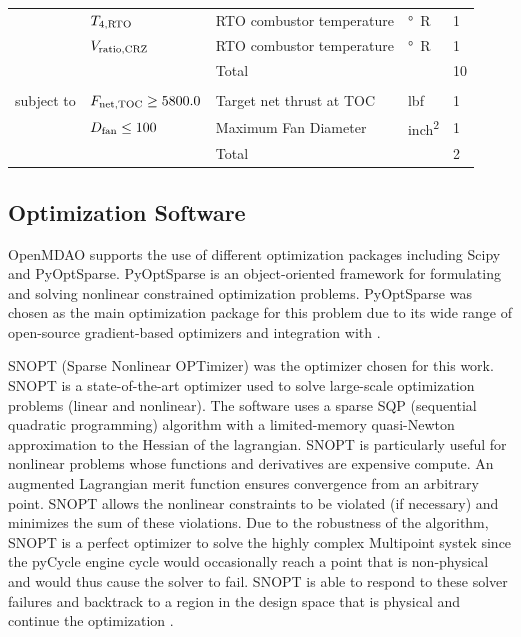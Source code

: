 \documentclass[conf]{new-aiaa}
\begin{document}
\begin{table}[hbt!]
\begin{tabular}{r l l l l}
                        & $T_{4,\rm{RTO}}$               & RTO combustor temperature                   & \unit{\degree R} & 1        \\
                        & $V_{\rm{ratio,CRZ}}$           & RTO combustor temperature                   & \unit{\degree R} & 1        \\
        \cline{3-5}
                        &                                & Total                                       &                  & 10       \\
                        &                                &                                             &                  &          \\
        subject to      & $F_{\rm{net,TOC}} \geq 5800.0$ & Target net thrust at TOC                    & \unit{lbf}       & 1        \\
                        & $D_{\rm{fan}} \leq 100$        & Maximum Fan Diameter                        & \unit{inch^2}    & 1        \\
        \cline{3-5}
                        &                                & Total                                       &                  & 2        \\
        \bottomrule
    \end{tabular}
    \label{tab:opt_problem}
\end{table}

\subsection{Optimization Software}
OpenMDAO supports the use of different optimization packages including Scipy and PyOptSparse.
PyOptSparse is an object-oriented framework for formulating and solving nonlinear constrained optimization problems.
PyOptSparse was chosen as the main optimization package for this problem due to its wide range of open-source gradient-based optimizers and integration with  \cite{Wu2020a}.

SNOPT (Sparse Nonlinear OPTimizer) was the optimizer chosen for this work.
SNOPT is a state-of-the-art optimizer used to solve large-scale optimization problems (linear and nonlinear).
The software uses a sparse SQP (sequential quadratic programming) algorithm with a limited-memory quasi-Newton approximation to the Hessian of the lagrangian.
SNOPT is particularly useful for nonlinear problems whose functions and derivatives are expensive compute.
An augmented Lagrangian merit function ensures convergence from an arbitrary point.
SNOPT allows the nonlinear constraints to be violated (if necessary) and minimizes the sum of these violations.
Due to the robustness of the algorithm, SNOPT is a perfect optimizer to solve the highly complex Multipoint systek since the pyCycle engine cycle would occasionally reach a point that is non-physical and would thus cause the solver to fail.
SNOPT is able to respond to these solver failures and backtrack to a region in the design space that is physical and continue the optimization \cite{Gill2005a}.
\end{document}
